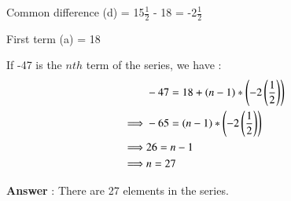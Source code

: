 \documentclass[journal,12pt,twocolumn]{IEEEtran}
\theoremstyle{remark}
\begin{document}
\vspace{4mm}

Common difference (d) = 15\(\frac{1}{2}\) - 18 = -2\(\frac{1}{2}\)

First term (a) = 18

\vspace{4mm}

If -47 is the \(n{th}\) term of the series, we have :
\begin{align}
&-47 = 18 + (n-1)*\left(-2\left(\frac{1}{2}\right)\right) \notag\\ 
\implies& -65 = (n-1)*\left(-2\left(\frac{1}{2}\right)\right) \notag\\
\implies& 26 = n-1\notag\\
\implies& n = 27\notag
\end{align} 

\large\textbf{Answer} : \normalsize There are 27 elements in the series.
\end{document}
